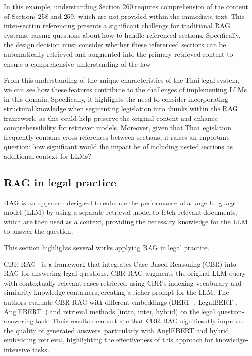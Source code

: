 In this example, understanding Section 260 requires comprehension of the content of Sections 258 and 259, which are not provided within the immediate text. 
%
This inter-section referencing presents a significant challenge for traditional RAG systems, raising questions about how to handle referenced sections. 
%
Specifically, the design decision must consider whether these referenced sections can be automatically retrieved and augmented into the primary retrieved content to ensure a comprehensive understanding of the law.

From this understanding of the unique characteristics of the Thai legal system, we can see how these features contribute to the challenges of implementing LLMs in this domain. 
%
Specifically, it highlights the need to consider incorporating structural knowledge when segmenting legislation into chunks within the RAG framework, as this could help preserve the original content and enhance comprehensibility for retriever models. 
%
Moreover, given that Thai legislation frequently contains cross-references between sections, it raises an important question: how significant would the impact be of including nested sections as additional context for LLMs?  


\subsection{RAG in legal practice}

{
RAG \cite{originalRAG} is an approach designed to enhance the performance of a large language model (LLM) by using a separate retrieval model to fetch relevant documents, which are then used as a context, providing the necessary knowledge for the LLM to answer the question.

This section highlights several works applying RAG in legal practice.
}

\label{sec:raginlegal}
CBR-RAG~\cite{CBR-RAG} is a framework that integrates Case-Based Reasoning (CBR) into RAG for answering legal questions.
%
CBR-RAG augments the original LLM query with contextually relevant cases retrieved using CBR’s indexing vocabulary and similarity knowledge containers, creating a richer prompt for the LLM. 
%
The authors evaluate CBR-RAG with different embeddings (BERT~\cite{bert}, LegalBERT~\cite{legalbert}, AnglEBERT~\cite{anglebert}) and retrieval methods (intra, inter, hybrid) on the legal question-answering task. 
%
Their results demonstrate that CBR-RAG significantly improves the quality of generated answers, particularly with AnglEBERT and hybrid embedding retrieval, highlighting the effectiveness of this approach for knowledge-intensive tasks.

